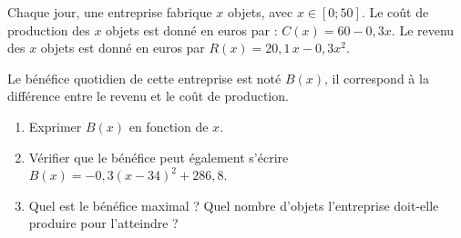 
\begin{exercice}\label{exosmath-0267}

Chaque jour, une entreprise fabrique $x$ objets, avec $x\in[0;50]$.  Le coût de production des $x$ objets est donné en euros par : $ C(x) = 60 - 0,3 x$. Le revenu des $x$ objets est donné en euros par $ R(x) = 20,\!1\, x - 0,3 x^2$. 

Le bénéfice quotidien de cette entreprise est noté $B(x)$, il correspond à la différence entre le revenu et le coût de production.
\begin{enumerate}
\item Exprimer $B(x)$ en fonction de $x$.
\item Vérifier que le bénéfice peut également s'écrire $ B(x) = -0,3(x-34)^2+286,8 $.
\item Quel est le bénéfice maximal ? Quel nombre d'objets l'entreprise doit-elle produire pour l'atteindre ?
\end{enumerate}

\end{exercice}
